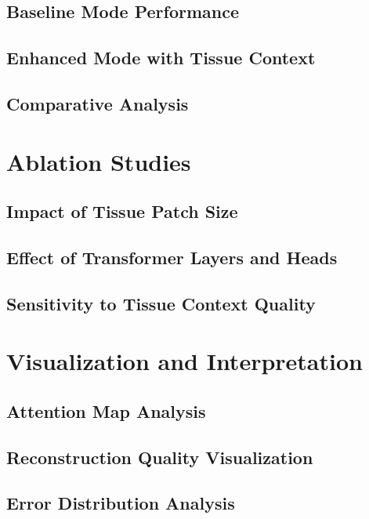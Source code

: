 \clearpage %

\subsection{Baseline Mode Performance}

\subsection{Enhanced Mode with Tissue Context}

\subsection{Comparative Analysis}

\section{Ablation Studies}

\clearpage %

\subsection{Impact of Tissue Patch Size}

\subsection{Effect of Transformer Layers and Heads}

\subsection{Sensitivity to Tissue Context Quality}

\section{Visualization and Interpretation}

\subsection{Attention Map Analysis}

\subsection{Reconstruction Quality Visualization}

\subsection{Error Distribution Analysis}

